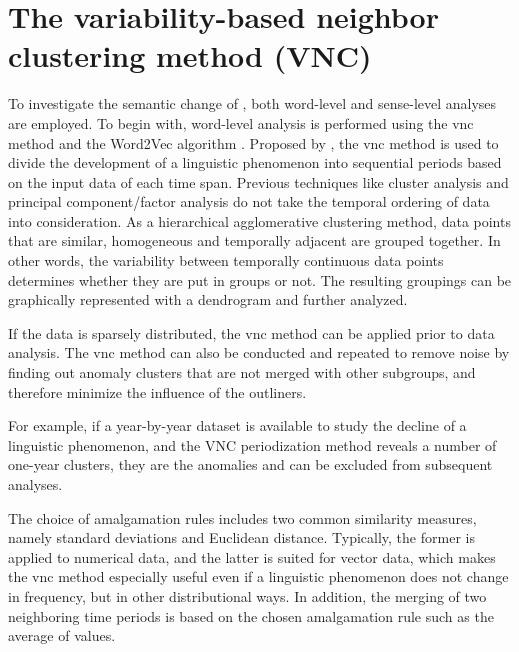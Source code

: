 \section{The variability-based neighbor clustering method ({VNC})}
To investigate the semantic change of \jia\rspace, both word-level and sense-level analyses are employed. To begin with, word-level analysis is performed using the \gls{vnc} method \parencite{gries2012variability} and the Word2Vec algorithm \parencite{mikolov2013efficient}. Proposed by \textcite{gries2012variability}, the \gls{vnc} method is used to divide the development of a linguistic phenomenon into sequential periods based on the input data of each time span. Previous techniques like cluster analysis and principal component/factor analysis do not take the temporal ordering of data into consideration. As a hierarchical agglomerative clustering method, data points that are similar, homogeneous and temporally adjacent are grouped together. In other words, the variability between temporally continuous data points determines whether they are put in groups or not. The resulting groupings can be graphically represented with a dendrogram and further analyzed.

If the data is sparsely distributed, the \gls{vnc} method can be applied prior to data analysis. The \gls{vnc} method can also be conducted and repeated to remove noise by finding out anomaly clusters that are not merged with other subgroups, and therefore minimize the influence of the outliners.

For example, if a year-by-year dataset is available to study the decline of a linguistic phenomenon, and the VNC periodization method reveals a number of one-year clusters, they are the anomalies and can be excluded from subsequent analyses.

The choice of amalgamation rules includes two common similarity measures, namely standard deviations and Euclidean distance. Typically, the former is applied to numerical data, and the latter is suited for vector data, which makes the \gls{vnc} method especially useful even if a linguistic phenomenon does not change in frequency, but in other distributional ways. In addition, the merging of two neighboring time periods is based on the chosen amalgamation rule such as the average of values.

